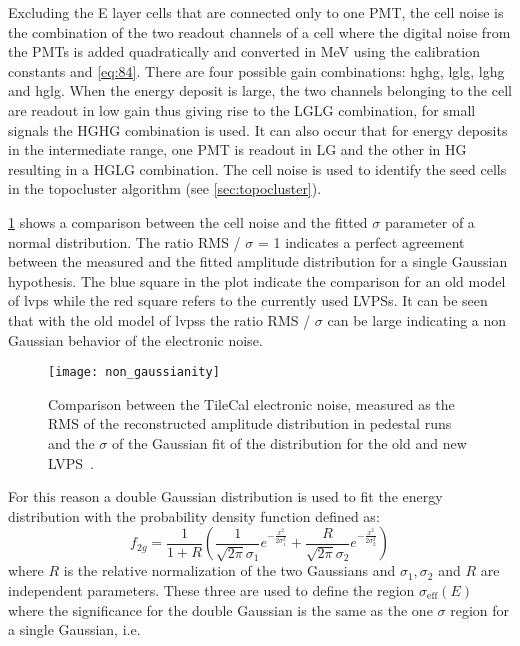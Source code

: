 Excluding the E layer cells that are connected only to one PMT, the cell noise
is the combination of the two readout channels of a cell where the digital noise
from the PMTs is added quadratically and converted in MeV using the calibration
constants and \cref{eq:84}. There are four possible gain combinations:
\gls{hghg}, \gls{lglg}, \gls{lghg} and \gls{hglg}. When the energy deposit is
large, the two channels belonging to the cell are readout in low gain thus
giving rise to the LGLG combination, for small signals the HGHG combination is
used. It can also occur that for energy deposits in the intermediate range, one
PMT is readout in LG and the other in HG resulting in a HGLG combination. The
cell noise is used to identify the seed cells in the topocluster algorithm (see
\cref{sec:topocluster}).

\cref{fig:non_gaussianity} shows a comparison between the cell noise and the
fitted $\sigma$ parameter of a normal distribution. The ratio RMS / $\sigma$ = 1
indicates a perfect agreement between the measured and the fitted amplitude
distribution for a single Gaussian hypothesis. The blue square in the plot
indicate the comparison for an old model of \gls{lvps} while the red square
refers to the currently used LVPSs. It can be seen that with the old model of
\glspl{lvps} the ratio RMS / $\sigma$ can be large indicating a non Gaussian
behavior of the electronic noise.
\begin{figure}[!htb]
  \centering
    \texttt{[image: non\_gaussianity]}
    \caption{Comparison between the TileCal electronic noise, measured as the
      RMS of the reconstructed amplitude distribution in pedestal runs and the
      $\sigma$ of the Gaussian fit of the distribution for the old and new
      LVPS~\cite{TileCalNoisePub}.}
    \label{fig:non_gaussianity}
\end{figure}
For this reason a double Gaussian distribution is used to fit the energy
distribution with the probability density function defined as:
\begin{equation}
  \label{eq:85}
  f_{2g} = \frac{1}{1 + R} \left( \frac{1}{\sqrt{2 \pi} \sigma_1} e^{-
      \frac{x^2}{2 \sigma_1^2}} + \frac{R}{\sqrt{2 \pi} \sigma_2} e^{-
      \frac{x^2}{2 \sigma_2^2}} \right)
\end{equation}
where $R$ is the relative normalization of the two Gaussians and
$\sigma_1, \sigma_2$ and $R$ are independent parameters. These three are used to
define the region $\sigma_{\text{eff}}(E)$ where the significance for the double
Gaussian is the same as the one $\sigma$ region for a single Gaussian, i.e.
